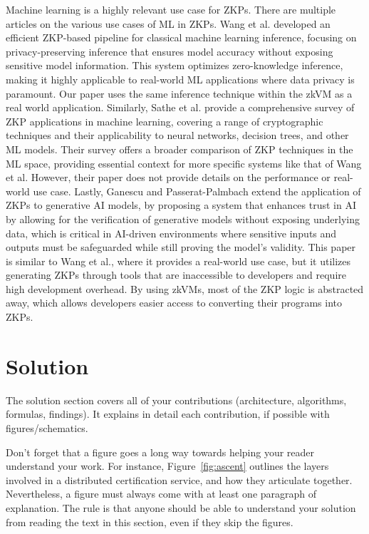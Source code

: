 \documentclass{scrartcl}
\begin{document}
Machine learning is a highly relevant use case for ZKPs. There are multiple articles on the various use cases of ML in ZKPs. Wang et al.\cite{wang2024efficient} developed an efficient ZKP-based pipeline for classical machine learning inference, focusing on privacy-preserving inference that ensures model accuracy without exposing sensitive model information. This system optimizes zero-knowledge inference, making it highly applicable to real-world ML applications where data privacy is paramount. Our paper uses the same inference technique within the zkVM as a real world application. Similarly, Sathe et al.\cite{sathe2024survey} provide a comprehensive survey of ZKP applications in machine learning, covering a range of cryptographic techniques and their applicability to neural networks, decision trees, and other ML models. Their survey offers a broader comparison of ZKP techniques in the ML space, providing essential context for more specific systems like that of Wang et al. However, their paper does not provide details on the performance or real-world use case. Lastly, Ganescu and Passerat-Palmbach\cite{ganescu2024trust} extend the application of ZKPs to generative AI models, by proposing a system that enhances trust in AI by allowing for the verification of generative models without exposing underlying data, which is critical in AI-driven environments where sensitive inputs and outputs must be safeguarded while still proving the model’s validity. This paper is similar to Wang et al., where it provides a real-world use case, but it utilizes generating ZKPs through tools that are inaccessible to developers and require high development overhead. By using zkVMs, most of the ZKP logic is abstracted away, which allows developers easier access to converting their programs into ZKPs.

\section{Solution}

The solution section covers all of your contributions (architecture, algorithms, formulas, findings).
It explains in detail each contribution, if possible with figures/schematics.

Don't forget that a figure goes a long way towards helping your reader understand your work. For instance, Figure~\ref{fig:ascent} outlines the layers involved in a distributed certification service, and how they articulate together. Nevertheless, a figure must always come with at least one paragraph of explanation. The rule is that anyone should be able to understand your solution from reading the text in this section, even if they skip the figures.
\end{document}
